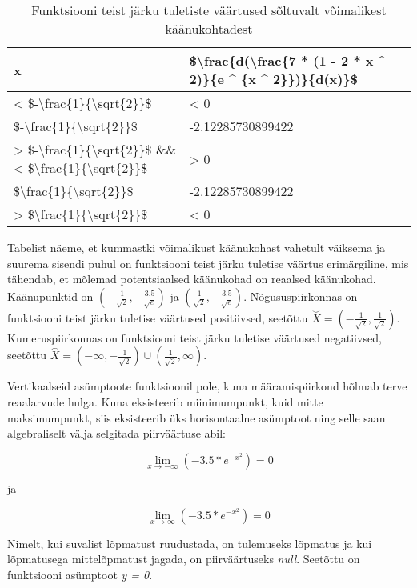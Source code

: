 \documentclass[
]{article}
\begin{document}
\begin{table}

\caption{\label{tab:unnamed-chunk-6}Funktsiooni teist järku tuletiste väärtused sõltuvalt võimalikest käänukohtadest}
\centering
\begin{tabular}[t]{l|l}
\hline
x & \$\textbackslash{}frac\{d(\textbackslash{}frac\{7 * (1 - 2 * x \textasciicircum{} 2)\}\{e \textasciicircum{} \{x \textasciicircum{} 2\}\})\}\{d(x)\}\$\\
\hline
< \$-\textbackslash{}frac\{1\}\{\textbackslash{}sqrt\{2\}\}\$ & < 0\\
\hline
\$-\textbackslash{}frac\{1\}\{\textbackslash{}sqrt\{2\}\}\$ & -2.12285730899422\\
\hline
> \$-\textbackslash{}frac\{1\}\{\textbackslash{}sqrt\{2\}\}\$ \&\& < \$\textbackslash{}frac\{1\}\{\textbackslash{}sqrt\{2\}\}\$ & > 0\\
\hline
\$\textbackslash{}frac\{1\}\{\textbackslash{}sqrt\{2\}\}\$ & -2.12285730899422\\
\hline
> \$\textbackslash{}frac\{1\}\{\textbackslash{}sqrt\{2\}\}\$ & < 0\\
\hline
\end{tabular}
\end{table}

Tabelist näeme, et kummastki võimalikust käänukohast vahetult väiksema ja suurema sisendi puhul on funktsiooni teist järku tuletise väärtus erimärgiline, mis tähendab, et mõlemad potentsiaalsed käänukohad on reaalsed käänukohad. Käänupunktid on \((-\frac{1}{\sqrt{2}}, -\frac{3.5}{\sqrt{e}})\) ja \((\frac{1}{\sqrt{2}}, -\frac{3.5}{\sqrt{e}})\). Nõgususpiirkonnas on funktsiooni teist järku tuletise väärtused positiivsed, seetõttu \(\overset{\smile}{X} = (-\frac{1}{\sqrt{2}}, \frac{1}{\sqrt{2}})\). Kumeruspiirkonnas on funktsiooni teist järku tuletise väärtused negatiivsed, seetõttu \(\overset{\frown}{X} = (-\infty, -\frac{1}{\sqrt{2}}) \cup (\frac{1}{\sqrt{2}}, \infty)\).

Vertikaalseid asümptoote funktsioonil pole, kuna määramispiirkond hõlmab terve reaalarvude hulga. Kuna eksisteerib miinimumpunkt, kuid mitte maksimumpunkt, siis eksisteerib üks horisontaalne asümptoot ning selle saan algebraliselt välja selgitada piirväärtuse abil:

\[\lim_{x \to -\infty} (-3.5 * e ^ {-x ^ 2}) = 0\]

ja

\[\lim_{x \to \infty} (-3.5 * e ^ {-x ^ 2}) = 0\]

Nimelt, kui suvalist lõpmatust ruudustada, on tulemuseks lõpmatus ja kui lõpmatusega mittelõpmatust jagada, on piirväärtuseks \emph{null}. Seetõttu on funktsiooni asümptoot \emph{y = 0}.
\end{document}
